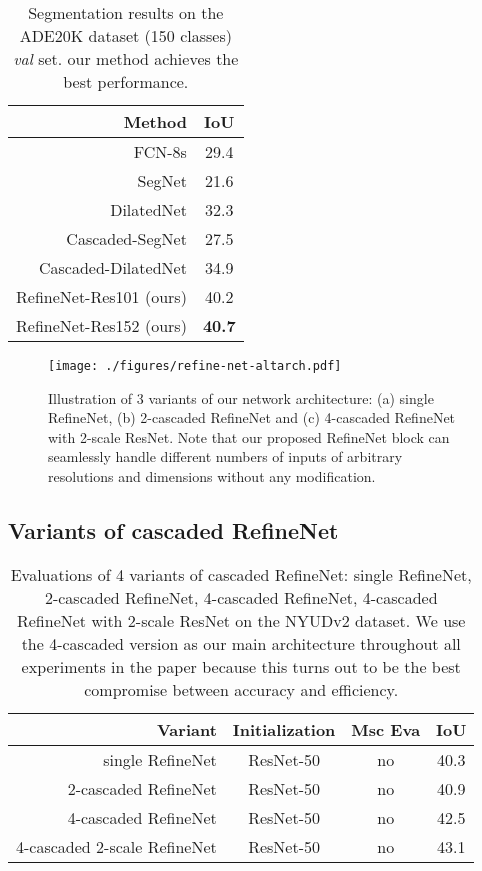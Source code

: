 \documentclass[10pt,twocolumn,letterpaper]{article}
\def\best{\bf \cellcolor[gray]{0.85}}
\def\secbest{\cellcolor[gray]{0.92} }
\begin{document}
\begin{table}[t]
\caption{Segmentation results on the ADE20K dataset (150 classes)  \emph{val} set.
our method achieves the best performance.
}
\centering
\resizebox{.55\linewidth}{!}
  {
  \begin{tabular}{ r |  c }
Method  & IoU\\ \hline \hline
FCN-8s \cite{LongSD14}   &  29.4\\
SegNet \cite{BadrinarayananK15}  &  21.6\\
DilatedNet \cite{ChenPKMY14,YuK15}   &  32.3\\
Cascaded-SegNet \cite{ZhouZPFBT16}   &  27.5\\
Cascaded-DilatedNet \cite{ZhouZPFBT16}   &  34.9\\ \hline \hline
RefineNet-Res101 (ours) & \secbest 40.2 \\
RefineNet-Res152 (ours) & \best 40.7 \\
 \end{tabular}
  }
\label{tab:ADE}
\end{table}






\begin{figure*}[t]
  \centering  
  \texttt{[image: ./figures/refine-net-altarch.pdf]}
\caption{Illustration of 3 variants of our network architecture:  (a) single RefineNet, (b) 2-cascaded RefineNet and (c) 4-cascaded RefineNet with 2-scale ResNet. Note that our proposed RefineNet block can seamlessly handle different numbers of inputs of arbitrary resolutions and dimensions without any modification.}
\label{fig:refine-net-variants}
\end{figure*}




\subsection{Variants of cascaded RefineNet}
\label{sec:alt-arch}



\begin{table}
\caption{Evaluations of 4 variants of cascaded RefineNet: single RefineNet, 2-cascaded RefineNet, 4-cascaded RefineNet, 4-cascaded RefineNet with 2-scale ResNet on the NYUDv2 dataset. 
We use the 4-cascaded version as our main architecture throughout all experiments in the paper because this turns out to be the best compromise between accuracy and efficiency.
}
\centering
\resizebox{1\linewidth}{!} 
  {
  \begin{tabular}{ r |  c | c | c }
Variant & Initialization   &Msc Eva &IoU \\ \hline \hline
single RefineNet & ResNet-50  &no & 40.3\\
2-cascaded RefineNet & ResNet-50  &no & 40.9\\
4-cascaded RefineNet & ResNet-50  &no & 42.5\\
4-cascaded 2-scale RefineNet & ResNet-50  &no & 43.1\\
 \end{tabular}
  }
\label{tab:variant}
\end{table}
\end{document}
